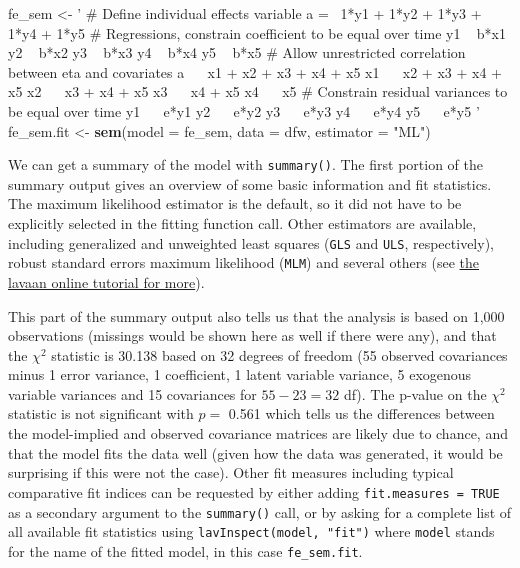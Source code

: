 \documentclass[
  12pt,
  a4paper]{article}
\newenvironment{Shaded}{\begin{snugshade}}{\end{snugshade}}
\newcommand{\DataTypeTok}[1]{\textcolor[rgb]{0.13,0.29,0.53}{#1}}
\newcommand{\KeywordTok}[1]{\textcolor[rgb]{0.13,0.29,0.53}{\textbf{#1}}}
\newcommand{\NormalTok}[1]{#1}
\newcommand{\StringTok}[1]{\textcolor[rgb]{0.31,0.60,0.02}{#1}}
\begin{document}
\begin{Shaded}
\begin{Highlighting}[]
\NormalTok{fe_sem <-}\StringTok{ '}
\StringTok{# Define individual effects variable }
\StringTok{a =~ 1*y1 + 1*y2 + 1*y3 + 1*y4 + 1*y5}
\StringTok{# Regressions, constrain coefficient to be equal over time}
\StringTok{y1 ~ b*x1}
\StringTok{y2 ~ b*x2 }
\StringTok{y3 ~ b*x3}
\StringTok{y4 ~ b*x4}
\StringTok{y5 ~ b*x5}
\StringTok{# Allow unrestricted correlation between eta and covariates}
\StringTok{a ~~ x1 + x2 + x3 + x4 + x5}
\StringTok{x1 ~~ x2 + x3 + x4 + x5}
\StringTok{x2 ~~ x3 + x4 + x5}
\StringTok{x3 ~~ x4 + x5}
\StringTok{x4 ~~ x5}
\StringTok{# Constrain residual variances to be equal over time}
\StringTok{y1 ~~ e*y1}
\StringTok{y2 ~~ e*y2}
\StringTok{y3 ~~ e*y3}
\StringTok{y4 ~~ e*y4}
\StringTok{y5 ~~ e*y5}
\StringTok{'}
\NormalTok{fe_sem.fit <-}\StringTok{ }\KeywordTok{sem}\NormalTok{(}\DataTypeTok{model =}\NormalTok{ fe_sem, }
                  \DataTypeTok{data =}\NormalTok{ dfw, }
                  \DataTypeTok{estimator =} \StringTok{"ML"}\NormalTok{)}
\end{Highlighting}
\end{Shaded}

\doublespacing

\singlespacing

\doublespacing

We can get a summary of the model with \texttt{summary()}. The first
portion of the summary output gives an overview of some basic
information and fit statistics. The maximum likelihood estimator is the
default, so it did not have to be explicitly selected in the fitting
function call. Other estimators are available, including generalized and
unweighted least squares (\texttt{GLS} and \texttt{ULS}, respectively),
robust standard errors maximum likelihood (\texttt{MLM}) and several
others (see \href{https://lavaan.ugent.be/tutorial/est.html}{the lavaan
online tutorial for more}).

This part of the summary output also tells us that the analysis is based
on 1,000 observations (missings would be shown here as well if there
were any), and that the \(\chi^{2}\) statistic is 30.138 based on 32
degrees of freedom (55 observed covariances minus 1 error variance, 1
coefficient, 1 latent variable variance, 5 exogenous variable variances
and 15 covariances for \(55 - 23 = 32\) df). The p-value on the
\(\chi^{2}\) statistic is not significant with \(p =\) 0.561 which tells
us the differences between the model-implied and observed covariance
matrices are likely due to chance, and that the model fits the data well
(given how the data was generated, it would be surprising if this were
not the case). Other fit measures including typical comparative fit
indices can be requested by either adding \texttt{fit.measures\ =\ TRUE}
as a secondary argument to the \texttt{summary()} call, or by asking for
a complete list of all available fit statistics using
\texttt{lavInspect(model,\ "fit")} where \texttt{model} stands for the
name of the fitted model, in this case \texttt{fe\_sem.fit}.
\end{document}
